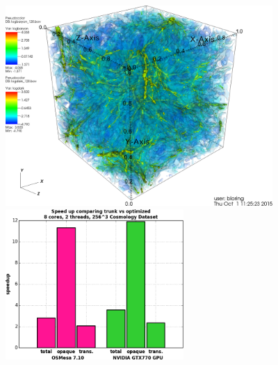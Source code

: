 \documentclass[a4paper,10pt]{report}
\begin{document}
\begin{figure}
\begin{minipage}{0.56\textwidth}
\includegraphics[height=3.0in]{./cosmology_test_case_0080.png} 
\end{minipage}
\begin{minipage}{0.30\textwidth}
\includegraphics[height=2.25in]{./speed_up_cosmo.png} 
\end{minipage}


\end{figure}
\end{document}
